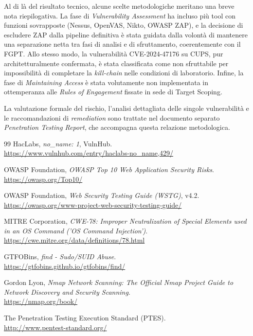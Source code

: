 \documentclass[11pt]{report}
\begin{document}
	Al di là del risultato tecnico, alcune scelte metodologiche meritano una breve nota riepilogativa. La fase di \textit{Vulnerability Assessment} ha incluso più tool con funzioni sovrapposte (Nessus, OpenVAS, Nikto, OWASP ZAP), e la decisione di escludere ZAP dalla pipeline definitiva è stata guidata dalla volontà di mantenere una separazione netta tra fasi di analisi e di sfruttamento, coerentemente con il FGPT. Allo stesso modo, la vulnerabilità CVE-2024-47176 su CUPS, pur architetturalmente confermata, è stata classificata come non sfruttabile per impossibilità di completare la \textit{kill-chain} nelle condizioni di laboratorio. Infine, la fase di \textit{Maintaining Access} è stata volutamente non implementata in ottemperanza alle \textit{Rules of Engagement} fissate in sede di Target Scoping.
	
	La valutazione formale del rischio, l'analisi dettagliata delle singole vulnerabilità e le raccomandazioni di \textit{remediation} sono trattate nel documento separato \textit{Penetration Testing Report}, che accompagna questa relazione metodologica.
	
	\cleardoublepage
	\begin{thebibliography}{99}
		HacLabs, \textit{no\_name: 1}, VulnHub. \\
		\url{https://www.vulnhub.com/entry/haclabs-no_name,429/}
		
		OWASP Foundation, \textit{OWASP Top 10 Web Application Security Risks}. \\
		\url{https://owasp.org/Top10/}
		
		OWASP Foundation, \textit{Web Security Testing Guide (WSTG)}, v4.2. \\
		\url{https://owasp.org/www-project-web-security-testing-guide/}
		
		MITRE Corporation, \textit{CWE-78: Improper Neutralization of Special Elements used in an OS Command ('OS Command Injection')}. \\
		\url{https://cwe.mitre.org/data/definitions/78.html}
		
		GTFOBins, \textit{find - Sudo/SUID Abuse}. \\
		\url{https://gtfobins.github.io/gtfobins/find/}
		
		Gordon Lyon, \textit{Nmap Network Scanning: The Official Nmap Project Guide to Network Discovery and Security Scanning}. \\
		\url{https://nmap.org/book/}
		
		The Penetration Testing Execution Standard (PTES). \\
		\url{http://www.pentest-standard.org/}
	\end{thebibliography}
	
\end{document}
